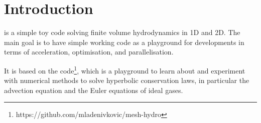 \newpage


\section{Introduction}


\hydro is a simple toy code solving finite volume hydrodynamics in 1D and 2D.
The main goal is to have simple working code as a playground for developments
in terms of acceleration, optimisation, and parallelisation.

It is based on the 
code\footnote{https://github.com/mladenivkovic/mesh-hydro}, which is a
playground to learn about and experiment with numerical methods to solve
hyperbolic conservation laws, in particular the advection equation and the
Euler equations of ideal gases.




